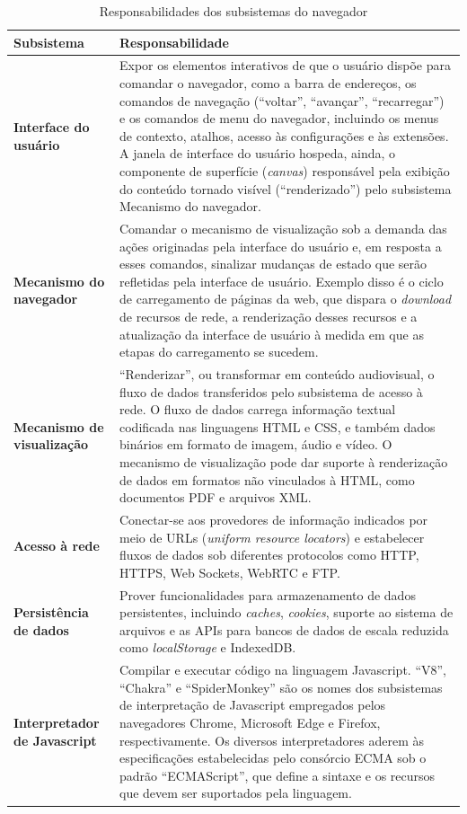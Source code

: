 \begin{table}
{\small\renewcommand{\arraystretch}{1.5}
	\begin{tabularx}{\textwidth}{|l|X|}
		\hline 
		\textbf{Subsistema} & \textbf{Responsabilidade} \\ 
		\hline 
		\textbf{Interface do usuário} & Expor os elementos interativos de que o usuário dispõe para comandar o navegador, como a barra de endereços, os comandos de navegação (``voltar'', ``avançar'', ``recarregar'') e os comandos de menu do navegador, incluindo os menus de contexto, atalhos, acesso às configurações e às extensões. A janela de interface do usuário hospeda, ainda, o componente de superfície (\textit{canvas}) responsável pela exibição do conteúdo tornado visível (``renderizado'') pelo subsistema Mecanismo do navegador.\\ 
		\hline 
		\textbf{Mecanismo do navegador} & Comandar o mecanismo de visualização sob a demanda das ações originadas pela interface do usuário e, em resposta a esses comandos, sinalizar mudanças de estado que serão refletidas pela interface de usuário. Exemplo disso é o ciclo de carregamento de páginas da web, que dispara o \textit{download} de recursos de rede, a renderização desses recursos e a atualização da interface de usuário à medida em que as etapas do carregamento se sucedem.\\ 
		\hline
		\textbf{Mecanismo de visualização} & ``Renderizar'', ou transformar em conteúdo audiovisual, o fluxo de dados transferidos pelo subsistema de acesso à rede. O fluxo de dados carrega informação textual codificada nas linguagens HTML e CSS, e também dados binários em formato de imagem, áudio e vídeo. O mecanismo de visualização pode dar suporte à renderização de dados em formatos não vinculados à HTML, como documentos PDF e arquivos XML.\\
		\hline
		\textbf{Acesso à rede} & Conectar-se aos provedores de informação indicados por meio de URLs (\textit{uniform resource locators}) e estabelecer fluxos de dados sob diferentes protocolos como HTTP, HTTPS, Web Sockets, WebRTC e FTP.\\
		\hline
		\textbf{Persistência de dados} & Prover funcionalidades para armazenamento de dados persistentes, incluindo \textit{caches}, \textit{cookies}, suporte ao sistema de arquivos e as APIs para bancos de dados de escala reduzida como \textit{localStorage} e IndexedDB.\\
		\hline
		\textbf{Interpretador de Javascript} & Compilar e executar código na linguagem Javascript. ``V8'', ``Chakra'' e ``SpiderMonkey'' são os nomes dos subsistemas de interpretação de Javascript empregados pelos navegadores Chrome, Microsoft Edge e Firefox, respectivamente. Os diversos interpretadores aderem às especificações estabelecidas pelo consórcio ECMA sob o padrão ``ECMAScript'', que define a sintaxe e os recursos que devem ser suportados pela linguagem.\\
		\hline
	\end{tabularx}
}
\caption{Responsabilidades dos subsistemas do navegador}
\label{table:tabela01}
\end{table}

